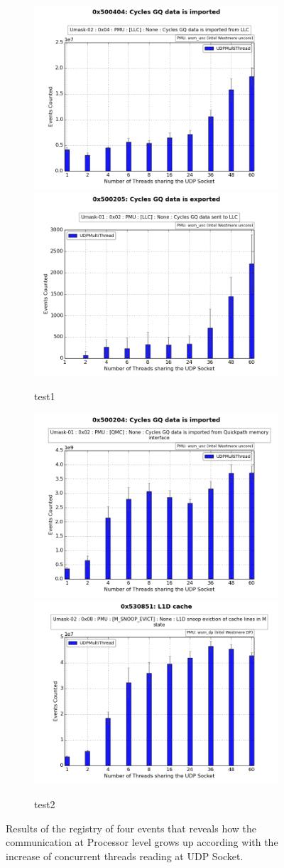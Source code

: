 \documentclass[journal]{IEEEtran}
\begin{document}
\begin{figure}[h!]
\centering
\begin{subfigure}{\columnwidth}
	\includegraphics[width = 0.495\columnwidth]{Imagenes/r500404}
	\includegraphics[width = 0.495\columnwidth]{Imagenes/r500205}
	\caption{test1}
	\label{exp1}
\end{subfigure}\hfill

\begin{subfigure}{\columnwidth}
	\includegraphics[width = 0.495\columnwidth]{Imagenes/r500204}
	\includegraphics[width = 0.495\columnwidth]{Imagenes/r530851}
	\caption{test2}
	\label{exp2}
\end{subfigure}

\caption{Results of the registry of four events that reveals how the communication at Processor level grows up according with the increase of concurrent threads reading at UDP Socket.}
\label{fig:4events}
\end{figure}
\end{document}

